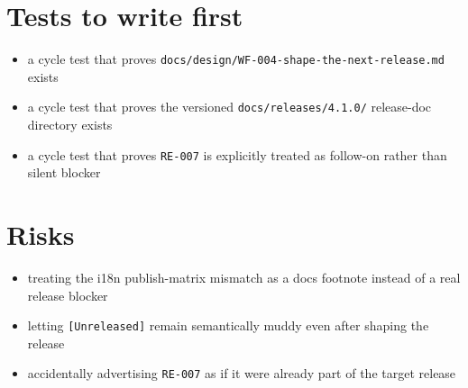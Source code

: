 \section{Tests to write first}\label{record-202-tests-to-write-first}

\begin{itemize}
\tightlist
\item
  a cycle test that proves \texttt{d\allowbreak{}o\allowbreak{}c\allowbreak{}s\allowbreak{}/\allowbreak{}d\allowbreak{}e\allowbreak{}s\allowbreak{}i\allowbreak{}g\allowbreak{}n\allowbreak{}/\allowbreak{}W\allowbreak{}F\allowbreak{}-\allowbreak{}0\allowbreak{}0\allowbreak{}4\allowbreak{}-\allowbreak{}s\allowbreak{}h\allowbreak{}a\allowbreak{}p\allowbreak{}e\allowbreak{}-\allowbreak{}t\allowbreak{}h\allowbreak{}e\allowbreak{}-\allowbreak{}n\allowbreak{}e\allowbreak{}x\allowbreak{}t\allowbreak{}-\allowbreak{}r\allowbreak{}e\allowbreak{}l\allowbreak{}e\allowbreak{}a\allowbreak{}s\allowbreak{}e\allowbreak{}.\allowbreak{}m\allowbreak{}d} exists
\item
  a cycle test that proves the versioned \texttt{d\allowbreak{}o\allowbreak{}c\allowbreak{}s\allowbreak{}/\allowbreak{}r\allowbreak{}e\allowbreak{}l\allowbreak{}e\allowbreak{}a\allowbreak{}s\allowbreak{}e\allowbreak{}s\allowbreak{}/\allowbreak{}4\allowbreak{}.\allowbreak{}1\allowbreak{}.\allowbreak{}0\allowbreak{}/} release-doc directory exists
\item
  a cycle test that proves \texttt{R\allowbreak{}E\allowbreak{}-\allowbreak{}0\allowbreak{}0\allowbreak{}7} is explicitly treated as follow-on rather than silent blocker
\end{itemize}

\section{Risks}\label{record-202-risks}

\begin{itemize}
\tightlist
\item
  treating the i18n publish-matrix mismatch as a docs footnote instead of a real release blocker
\item
  letting \texttt{[\allowbreak{}U\allowbreak{}n\allowbreak{}r\allowbreak{}e\allowbreak{}l\allowbreak{}e\allowbreak{}a\allowbreak{}s\allowbreak{}e\allowbreak{}d\allowbreak{}]} remain semantically muddy even after shaping the release
\item
  accidentally advertising \texttt{R\allowbreak{}E\allowbreak{}-\allowbreak{}0\allowbreak{}0\allowbreak{}7} as if it were already part of the target release
\end{itemize}


